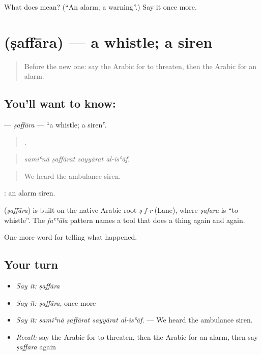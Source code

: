 \begin{tcolorbox}[breakable,colback=teal!4,colframe=teal!35!black,title={Before you move on}]
What does  mean? (\textquotedblleft{}An alarm; a warning\textquotedblright{}.) Say it once more.
\end{tcolorbox}
\section[\texorpdfstring{\ar{صفارة} (ṣaffāra)}{صفارة (ṣaffāra)}]{ (ṣaffāra) — a whistle; a siren}

\label{lesson:AR-C324-saffara}



\begin{quote}
Before the new one: say the Arabic for to threaten, then the Arabic for an alarm.
\end{quote}

\subsection*{You'll want to know: }
\textbf{} — \emph{ṣaffāra} — \textquotedblleft{}a whistle; a siren\textquotedblright{}.

\begin{quote}
   .
\end{quote}

\begin{quote}
\emph{samiʿnā ṣaffārat sayyārat al-isʿāf.}
\end{quote}

\begin{quote}
We heard the ambulance siren.
\end{quote}

 : an alarm siren.

\begin{cousinweb}
\textbf{} (\emph{ṣaffāra}) is built on the native Arabic root \emph{ṣ-f-r} (Lane), where \emph{ṣafara} is \textquotedblleft{}to whistle\textquotedblright{}. The \emph{faʿʿāla} pattern names a tool that does a thing again and again.
\end{cousinweb}

\begin{grammarlens}[title={What you've built}]
One more word for telling what happened.
\end{grammarlens}

\subsection*{Your turn}
\begin{itemize}
\raggedright
  \item \emph{Say it:} \emph{ṣaffāra}
  \item \emph{Say it:} \emph{ṣaffāra}, once more
  \item \emph{Say it:} \emph{samiʿnā ṣaffārat sayyārat al-isʿāf.} — We heard the ambulance siren.
  \item \emph{Recall:} say the Arabic for to threaten, then the Arabic for an alarm, then say \emph{ṣaffāra} again
\end{itemize}

